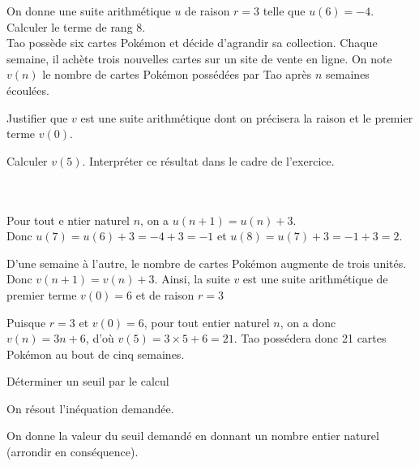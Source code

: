 \begin{exemple}
	 On donne une suite arithmétique $u$ de raison $r=3$ telle que $u(6)=-4$. Calculer le terme de rang 8.\\
	 Tao possède six cartes Pokémon et décide d'agrandir sa collection. Chaque semaine, il achète trois nouvelles cartes sur un site de vente en ligne.
	On note $v(n)$ le nombre de cartes Pokémon possédées par Tao après $n$ semaines écoulées.
	\begin{enumEx}
		\item Justifier que $v$ est une suite arithmétique dont on précisera la raison et le premier terme $v(0)$.
		\item Calculer $v(5)$. Interpréter ce résultat dans le cadre de l'exercice.
	\end{enumEx}
	\ \\
	\\
	  Pour tout e ntier naturel $n$, on a $u(n+1)=u(n)+3$.\\
	Donc $u(7)=u(6)+3=-4+3=-1$ et $u(8)=u(7)+3=-1+3=2$.\\
	\begin{enumEx}
		\item D'une semaine à l'autre, le nombre de cartes Pokémon augmente de trois unités. Donc $v(n+1)=v(n)+3$. Ainsi, la suite $v$ est une suite arithmétique de premier terme $v(0)=6$ et de raison $r=3$
		\item Puisque $r=3$ et $v(0)=6$, pour tout entier naturel $n$, on a donc $v(n)=3 n+6$, d'où $v(5)=3 \times 5+6=21$.
		Tao possédera donc 21 cartes Pokémon au bout de cinq semaines.
	\end{enumEx}
\end{exemple}

\begin{methodeTitre}{Déterminer un seuil par le calcul}
	\begin{itemMet}
		\item On résout l'inéquation demandée.
		\item On donne la valeur du seuil demandé en donnant un nombre entier naturel (arrondir en conséquence).
	\end{itemMet}
\end{methodeTitre}

